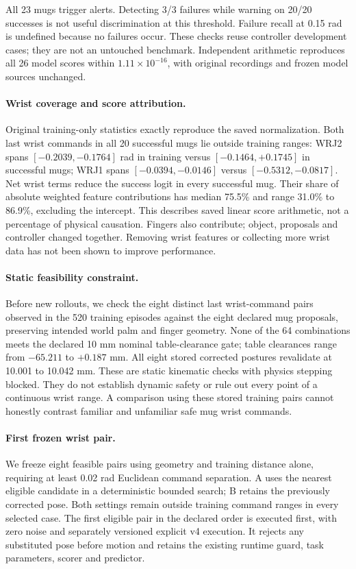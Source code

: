 \documentclass[10pt,letterpaper]{article}
\begin{document}
All 23 mugs trigger alerts. Detecting 3/3 failures while warning on 20/20
successes is not useful discrimination at this threshold. Failure recall at
0.15 rad is undefined because no failures occur. These checks reuse controller
development cases; they are not an untouched benchmark. Independent arithmetic
reproduces all 26 model scores within $1.11\times10^{-16}$, with original
recordings and frozen model sources unchanged.

\paragraph{Wrist coverage and score attribution.}
Original training-only statistics exactly reproduce the saved normalization.
Both last wrist commands in all 20 successful mugs lie outside training ranges:
WRJ2 spans $[-0.2039,-0.1764]$ rad in training versus
$[-0.1464,+0.1745]$ in successful mugs; WRJ1 spans
$[-0.0394,-0.0146]$ versus $[-0.5312,-0.0817]$.
Net wrist terms reduce the success logit in every successful mug. Their share
of absolute weighted feature contributions has median 75.5\% and range
31.0\% to 86.9\%, excluding the intercept. This describes saved linear score
arithmetic, not a percentage of physical causation. Fingers also contribute;
object, proposals and controller changed together. Removing wrist features
or collecting more wrist data has not been shown to improve performance.

\paragraph{Static feasibility constraint.}
Before new rollouts, we check the eight distinct last wrist-command pairs
observed in the 520 training episodes against the eight declared mug proposals,
preserving intended world palm and finger geometry. None of the 64 combinations
meets the declared 10 mm nominal table-clearance gate; table clearances range
from $-65.211$ to $+0.187$ mm. All eight stored corrected postures revalidate
at 10.001 to 10.042 mm. These are static kinematic checks with physics stepping
blocked. They do not establish dynamic safety or rule out every point of a
continuous wrist range. A comparison using these stored training pairs cannot
honestly contrast familiar and unfamiliar safe mug wrist commands.

\paragraph{First frozen wrist pair.}
We freeze eight feasible pairs using geometry and training distance alone,
requiring at least 0.02 rad Euclidean command separation. A uses the nearest
eligible candidate in a deterministic bounded search; B retains the previously
corrected pose. Both settings remain outside training command ranges in every
selected case. The first eligible pair in the declared order is executed first,
with zero noise and separately versioned explicit v4 execution. It rejects
any substituted pose before motion and retains the existing runtime guard,
task parameters, scorer and predictor.
\end{document}
